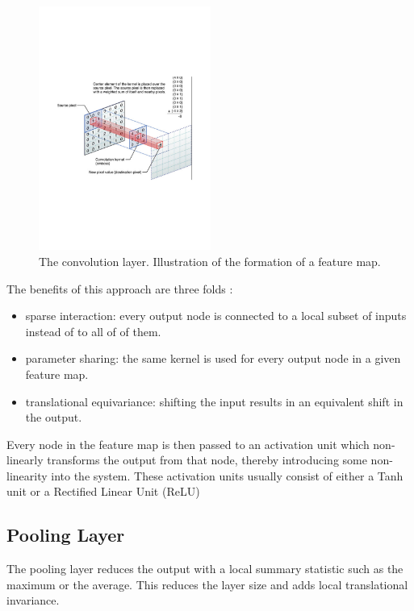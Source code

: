 \begin{figure}
\centering
\includegraphics[trim=2cm 7cm 2cm 7cm, clip=true, height=80mm]{Chapter1/convolution.pdf}
\caption{The convolution layer. Illustration of the formation of a feature map.}
\end{figure}

The benefits of this approach are three folds :

\begin{itemize}
	\item sparse interaction: every output node is connected to a local subset of inputs instead of to all of of them.
	\item parameter sharing: the same kernel is used for every output node in a given feature map. 
	\item translational equivariance: shifting the input results in an equivalent shift in the output.
\end{itemize}

Every node in the feature map is then passed to an activation unit which non-linearly transforms the output from that node, thereby introducing some non-linearity into the system. These activation units usually consist of either a Tanh unit or a Rectified Linear Unit (ReLU) 

\subsection{Pooling Layer}

The pooling layer reduces the output with a local summary statistic such as the maximum or the average. This reduces the layer size and adds local translational invariance.

